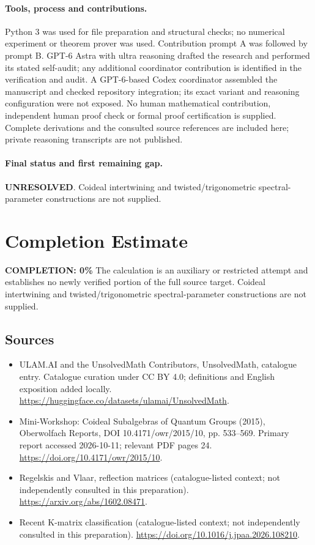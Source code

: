 \documentclass[11pt]{article}
\begin{document}
\paragraph{Tools, process and contributions.}
Python 3 was used for file preparation and structural checks; no numerical experiment or theorem prover was used. Contribution prompt A was followed by prompt B. GPT-6 Astra with ultra reasoning drafted the research and performed its stated self-audit; any additional coordinator contribution is identified in the verification and audit. A GPT-6-based Codex coordinator assembled the manuscript and checked repository integration; its exact variant and reasoning configuration were not exposed. No human mathematical contribution, independent human proof check or formal proof certification is supplied. Complete derivations and the consulted source references are included here; private reasoning transcripts are not published.

\paragraph{Final status and first remaining gap.}
\textbf{UNRESOLVED}. Coideal intertwining and twisted/trigonometric spectral-parameter constructions are not supplied.

\section{Completion Estimate}
\noindent\textbf{COMPLETION: 0\%}
The calculation is an auxiliary or restricted attempt and establishes no newly verified portion of the full source target. Coideal intertwining and twisted/trigonometric spectral-parameter constructions are not supplied.

\subsection{Sources}
\begin{itemize}
\item[\hypertarget{source:statement:1}{S1}] ULAM.AI and the UnsolvedMath Contributors, UnsolvedMath, catalogue entry. Catalogue curation under CC BY 4.0; definitions and English exposition added locally.
\url{https://huggingface.co/datasets/ulamai/UnsolvedMath}.
\item[\hypertarget{source:statement:2}{S2}] Mini-Workshop: Coideal Subalgebras of Quantum Groups (2015), Oberwolfach Reports, DOI 10.4171/owr/2015/10, pp. 533--569. Primary report accessed 2026-10-11; relevant PDF pages 24.
\url{https://doi.org/10.4171/owr/2015/10}.
\item[\hypertarget{source:statement:3}{S3}] Regelskis and Vlaar, reflection matrices (catalogue-listed context; not independently consulted in this preparation).
\url{https://arxiv.org/abs/1602.08471}.
\item[\hypertarget{source:statement:4}{S4}] Recent K-matrix classification (catalogue-listed context; not independently consulted in this preparation).
\url{https://doi.org/10.1016/j.jpaa.2026.108210}.
\end{itemize}
\label{end:statement}
\end{document}

